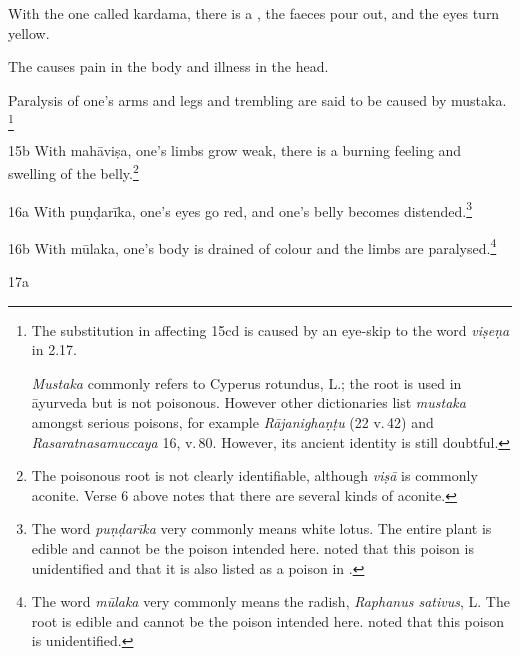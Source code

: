 \begin{translation}
With the one called \gls{kardama}, there is a
, the faeces pour out, and  the eyes turn
yellow. 

The  causes pain in
the body and illness in the head. 

Paralysis of one's arms and legs and trembling are said to be
caused by \gls{mustaka}.%
\footnote{The substitution in  affecting 15cd is
    caused by an eye-skip to the word \emph{viṣeṇa} in 2.17. 
    
    \emph{Mustaka} commonly refers to Cyperus rotundus, L.; the root is
    used in āyurveda but is not poisonous.  However other dictionaries
    list \emph{mustaka} amongst serious poisons, for example
    \emph{Rājanighaṇṭu} (22 v.\,42) and \emph{Rasaratnasamuccaya} 16,
    v.\,80.  However, its ancient identity is still doubtful.} 

\item[15b] With \gls{mahāviṣa},
    one's limbs grow weak, there is a burning feeling and swelling of
    the belly.\footnote{The poisonous root  is not clearly 
    identifiable, although \emph{viṣā} is
        commonly aconite.  Verse 6 above notes that there are several
        kinds of aconite.} 
        
\item[ 16a] With \gls{puṇḍarīka},  
        one's eyes go red, and one's belly becomes
        distended.\footnote{The word \emph{puṇḍarīka} very commonly means
            white lotus. The entire plant is
            edible and cannot be the poison intended here. \citet[252]{gvdb}
            noted that this poison is unidentified and that it is also listed
            as a poison in .}

\item[ 16b] With \gls{mūlaka},    
            one's body is drained of colour and the limbs are
            paralysed.\footnote{The word \emph{mūlaka} very commonly means
                the radish, \emph{Raphanus sativus}, L. The root is edible and
                cannot be the poison intended here. \citet[317]{gvdb} noted that
                this poison is unidentified.}
    
    \item[ 17a]
        

\end{translation}
